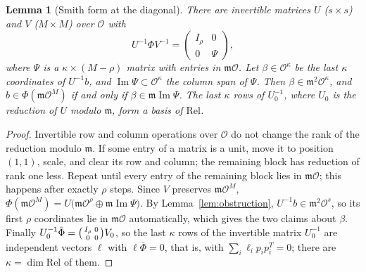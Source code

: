 \documentclass[11pt]{amsart}
\theoremstyle{plain}
\newtheorem{lemma}[theorem]{Lemma}
\theoremstyle{definition}
\begin{document}
\begin{lemma}[Smith form at the diagonal]\label{lem:smith}
There are invertible matrices $U$ ($s\times s$) and $V$ ($M\times M$) over $\mathcal O$ with
\[
 U^{-1}\Phi V^{-1}=\begin{pmatrix}I_\rho&0\\0&\Psi\end{pmatrix},
\]
where $\Psi$ is a $\kappa\times(M-\rho)$ matrix with entries in $\mathfrak m\mathcal O$. Let $\beta\in\mathcal O^\kappa$
be the last $\kappa$ coordinates of $U^{-1}b$, and $\operatorname{Im}\Psi\subset\mathcal O^\kappa$ the
column span of $\Psi$. Then $\beta\in\mathfrak m^2\mathcal O^\kappa$, and $b\in\Phi(\mathfrak m\mathcal O^M)$ if
and only if $\beta\in\mathfrak m\operatorname{Im}\Psi$. The last $\kappa$ rows of $U_0^{-1}$, where $U_0$ is the
reduction of $U$ modulo $\mathfrak m$, form a basis of $\mathrm{Rel}$.
\end{lemma}

\begin{proof}
Invertible row and column operations over $\mathcal O$ do not change the rank of the reduction modulo
$\mathfrak m$. If some entry of a matrix is a unit, move it to position $(1,1)$, scale, and clear its row and
column; the remaining block has reduction of rank one less. Repeat until every entry of the remaining
block lies in $\mathfrak m\mathcal O$; this happens after exactly $\rho$ steps. Since $V$ preserves
$\mathfrak m\mathcal O^M$,
$\Phi(\mathfrak m\mathcal O^M)=U\bigl(\mathfrak m\mathcal O^\rho\oplus\mathfrak m\operatorname{Im}\Psi\bigr)$.
By Lemma~\ref{lem:obstruction}, $U^{-1}b\in\mathfrak m^2\mathcal O^s$, so its first $\rho$ coordinates lie in
$\mathfrak m\mathcal O$ automatically, which gives the two claims about $\beta$. Finally
$U_0^{-1}\bar\Phi=\begin{psmallmatrix}I_\rho&0\\0&0\end{psmallmatrix}V_0$, so the last $\kappa$ rows of the
invertible matrix $U_0^{-1}$ are independent vectors $\ell$ with $\ell\bar\Phi=0$, that is, with
$\sum_i\ell_ip_ip_i^T=0$; there are $\kappa=\dim\mathrm{Rel}$ of them.
\end{proof}
\end{document}
